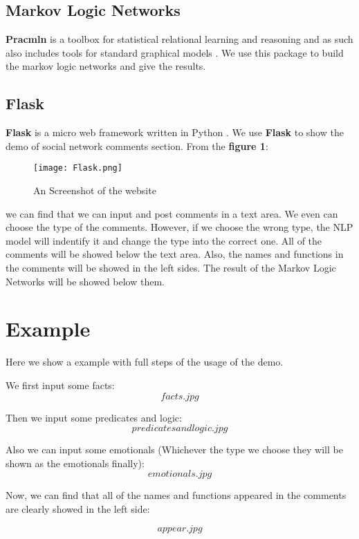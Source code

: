 \documentclass[
12pt, %
a4paper, %
oneside, %
headinclude,footinclude, %
BCOR5mm, %
]{scrartcl}
\begin{document}
\subsection{Markov Logic Networks}
\textbf{Pracmln} is a toolbox for statistical relational learning and reasoning and as such also includes tools for standard graphical models \cite{pracmln}. We use this package to build the markov logic networks and give the results.
\subsection{Flask}
\textbf{Flask} is a micro web framework written in Python 
\cite{grinberg2018flask}. We use \textbf{Flask} to show the demo of social network comments section. From the \textbf{figure 1}:
\begin{figure}[htb]
    \centering 
    \texttt{[image: Flask.png]} 
    \caption[An Screenshot of the website]{An Screenshot of the website} %
    \end{figure}

we can find that we can input and post comments in a text area. We even can choose the type of the comments. However, if we choose the wrong type, the NLP model will indentify it and change the type into the correct one. All of the comments will be showed below the text area. Also, the names and functions in the comments will be showed in the left sides. The result of the Markov Logic Networks will be showed below them.

\clearpage

\section{Example}
Here we show a example with full steps of the usage of the demo.

We first input some facts:
$$
facts.jpg
$$

Then we input some predicates and logic:
$$
predicates and logic.jpg
$$

Also we can input some emotionals (Whichever the type we choose they will be shown as the emotionals finally):
$$
emotionals.jpg
$$

Now, we can find that all of the names and functions appeared in the comments are clearly showed in the left side:

$$
appear.jpg
$$
\end{document}
